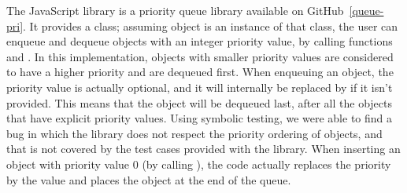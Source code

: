 
\FloatBarrier


The JavaScript  library is a priority queue library available on GitHub~\ref{queue-pri}.
It provides a  class; assuming object  is an instance of that class, the user can enqueue and dequeue objects with an integer priority value, by calling functions  and .
In this implementation, objects with smaller priority values are considered to have a higher priority and are dequeued first.
When enqueuing an object, the priority value is actually optional, and it will internally be replaced by  if it isn't provided.
This means that the object will be dequeued last, after all the objects that have explicit priority values.
Using \cosette symbolic testing, we were able to find a bug in which the library does not respect the priority ordering of objects, and that is not covered by the test cases provided with the library.
When inserting an object with priority value $0$ (by calling ), the code actually replaces the priority by the  value and places the object at the end of the queue.

